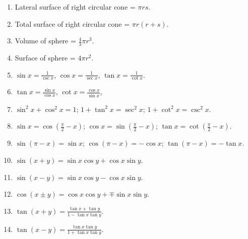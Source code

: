 \begin{enumerate}
\item
Lateral surface of right circular cone = $\pi rs$.

\item
Total surface of right circular cone = $\pi r\left(r + s\right)$.

\item
Volume of sphere = $\frac{4}{3}\pi r^3$.

 \item
Surface of sphere = $4\pi r^2$.

\item
$\sin x = \displaystyle{\frac{1}{\csc x}}$,
$\cos x = \displaystyle{\frac{1}{\sec x}}$,
$\tan x = \displaystyle{\frac{1}{\cot x}}$.

\item
$\tan x = \displaystyle{\frac{\sin x}{\cos x}}$,
$\cot x = \displaystyle{\frac{\cos x}{\sin x}}$,

\item
$\sin^2 x + \cos^2 x = 1$;
$1 + \tan^2 x = \sec^2 x$;
$1 + \cot^2 x = \csc^2 x$.

\item
$\sin x = \cos\left(\frac{\pi}{2} - x\right)$;
$\cos x = \sin\left(\frac{\pi}{2} - x\right)$;
$\tan x = \cot\left(\frac{\pi}{2} - x\right)$.

\item
$\sin\left(\pi - x\right) = \sin x$;
$\cos\left(\pi - x\right) = -\cos x$;
$\tan\left(\pi - x\right) = -\tan x$.

\item
$\sin\left(x + y\right) = \sin x \cos y + \cos x \sin y$.

\item
$\sin\left(x - y\right) = \sin x \cos y - \cos x \sin y$.

\item
$\cos\left(x \pm y\right) = \cos x \cos y + \mp \sin x \sin y$.

\item
$\tan\left(x + y\right) =
\displaystyle{ \frac{\tan x + \tan y}{1 - \tan x \tan y} }$.

\item
$\tan\left(x - y\right) =
\displaystyle{ \frac{\tan x \tan y}{1 + \tan x \tan y} }$.


\end{enumerate}
